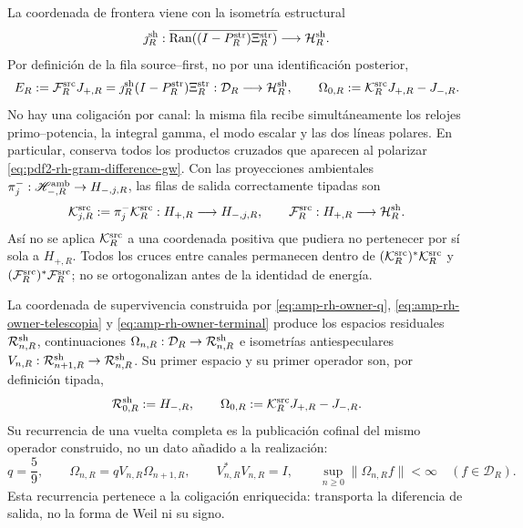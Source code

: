 La coordenada de frontera viene con la isometría estructural
\[
 \jmath_R^{\rm sh}:
 \overline{\operatorname{Ran}((I-P_R^{\rm str})\Xi_R^{\rm str})}
 \longrightarrow\mathcal H_R^{\rm sh}.
\]
Por definición de la fila source--first, no por una identificación posterior,
\begin{equation}\label{eq:pdf2-rh-source-state-output}
 E_R:=\mathcal F_R^{\rm src}J_{+,R}
     =\jmath_R^{\rm sh}(I-P_R^{\rm str})\Xi_R^{\rm str}:
 \mathcal D_R\longrightarrow\mathcal H_R^{\rm sh},
 \qquad
 \Omega_{0,R}:=\mathcal K_R^{\rm src}J_{+,R}-J_{-,R}.
\end{equation}
No hay una coligación por canal: la misma fila recibe simultáneamente los
relojes primo--potencia, la integral gamma, el modo escalar y las dos líneas
polares. En particular, conserva todos los productos cruzados que aparecen al
polarizar \eqref{eq:pdf2-rh-gram-difference-gw}.
Con las proyecciones ambientales \(\pi_j^-:\mathscr H_{-,R}^{\rm amb}
\to H_{-,j,R}\), las filas de salida correctamente tipadas son
\begin{equation}\label{eq:pdf2-rh-bloques-coligacion}
 \mathcal K_{j,R}^{\rm src}
 :=\pi_j^-\mathcal K_R^{\rm src}:
 H_{+,R}\longrightarrow H_{-,j,R},
 \qquad
 \mathcal F_R^{\rm src}:H_{+,R}\longrightarrow\mathcal H_R^{\rm sh}.
\end{equation}
Así no se aplica \(\mathcal K_R^{\rm src}\) a una coordenada positiva que
pudiera no pertenecer por sí sola a \(H_{+,R}\). Todos los cruces entre
canales permanecen dentro de
\((\mathcal K_R^{\rm src})^*\mathcal K_R^{\rm src}\) y
\((\mathcal F_R^{\rm src})^*\mathcal F_R^{\rm src}\); no se ortogonalizan
antes de la identidad de energía.

La coordenada de supervivencia construida por
\eqref{eq:amp-rh-owner-q}, \eqref{eq:amp-rh-owner-telescopia} y
\eqref{eq:amp-rh-owner-terminal} produce los espacios residuales
\(\mathcal R_{n,R}^{\rm sh}\), continuaciones
\(\Omega_{n,R}:\mathcal D_R\to\mathcal R_{n,R}^{\rm sh}\) e isometrías
antiespeculares
\(V_{n,R}:\mathcal R_{n+1,R}^{\rm sh}\to\mathcal R_{n,R}^{\rm sh}\). Su
primer espacio y su primer operador son, por definición tipada,
\[
 \mathcal R_{0,R}^{\rm sh}:=H_{-,R},\qquad
 \Omega_{0,R}:=\mathcal K_R^{\rm src}J_{+,R}-J_{-,R}.
\]
Su recurrencia de una vuelta completa es la publicación cofinal del mismo
operador construido, no un dato añadido a la realización:
\begin{equation}\label{eq:pdf2-rh-recurrencia-residual}
 q=\frac59,\qquad
 \Omega_{n,R}=qV_{n,R}\Omega_{n+1,R},
 \qquad V_{n,R}^*V_{n,R}=I,
 \qquad
 \sup_{n\geq0}\|\Omega_{n,R}f\|<\infty
 \quad(f\in\mathcal D_R).
\end{equation}
Esta recurrencia pertenece a la coligación enriquecida: transporta la
diferencia de salida, no la forma de Weil ni su signo.

